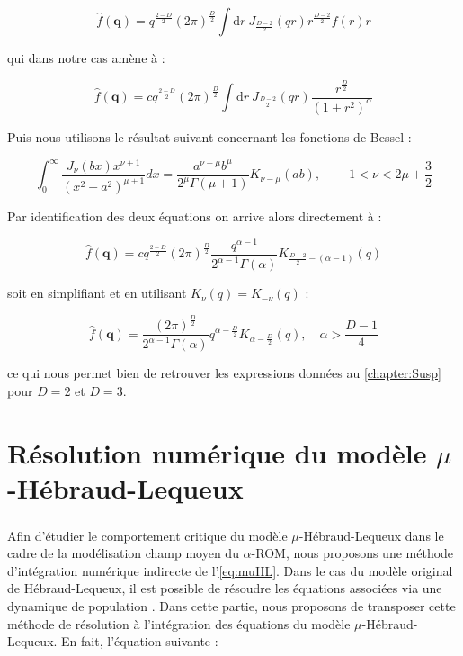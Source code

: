 \begin{equation}
	\hat{f}(\mathbf{q}) = q^{\frac{2-D}{2}}(2\pi)^{\frac{D}{2}}\int\mathrm{d}r~J_{\frac{D-2}{2}}(qr)r^\frac{D-2}{2}f(r)r
\end{equation}

\noindent qui dans notre cas amène à : 

\begin{equation}
	\hat{f}(\mathbf{q}) = c q^{\frac{2-D}{2}}(2\pi)^{\frac{D}{2}}\int\mathrm{d}r~J_{\frac{D-2}{2}}(qr)\frac{r^\frac{D}{2}}{(1+r^2)^\alpha}
\end{equation}

\noindent Puis nous utilisons le résultat suivant concernant les fonctions de Bessel \cite{zwillinger_6_7_2014} :

\begin{equation}
\int_0^{\infty} \frac{J_\nu(b x) x^{\nu+1}}{\left(x^2+a^2\right)^{\mu+1}} d x=\frac{a^{\nu-\mu} b^\mu}{2^\mu \Gamma(\mu+1)} K_{\nu-\mu}(a b), \quad -1 < \nu < 2\mu + \frac{3}{2}
\end{equation}

\noindent Par identification des deux équations on arrive alors directement à :

\begin{equation}
	\hat{f}(\mathbf{q}) = c q^{\frac{2-D}{2}}(2\pi)^{\frac{D}{2}}\frac{q^{\alpha-1}}{2^{\alpha - 1}\Gamma(\alpha)}K_{\frac{D-2}{2}-(\alpha-1)}(q)
\end{equation}

\noindent soit en simplifiant et en utilisant $K_\nu (q) = K_{-\nu}(q)$ :

\begin{equation}
	\hat{f}(\mathbf{q}) = \frac{(2\pi)^{\frac{D}{2}}}{2^{\alpha-1}\Gamma(\alpha)}q^{\alpha-\frac{D}{2}}K_{\alpha-\frac{D}{2}}(q), \quad \alpha > \frac{D-1}{4}
\end{equation}

\noindent ce qui nous permet bien de retrouver les expressions données au \autoref{chapter:Susp} pour $D=2$ et $D=3$.

\section{Résolution numérique du modèle $\mu$-Hébraud-Lequeux}

\label{sec:ResolNumMuHL}

\subparagraph{}Afin d'étudier le comportement critique du modèle $\mu$-Hébraud-Lequeux dans le cadre de la modélisation champ moyen du $\alpha$-ROM, nous proposons une méthode d'intégration numérique indirecte de l'\autoref{eq:muHL}. Dans le cas du modèle original de Hébraud-Lequeux, il est possible de résoudre les équations associées via une dynamique de population \cite{bouchaud_spontaneous_2016}. Dans cette partie, nous proposons de transposer cette méthode de résolution à l'intégration des équations du modèle $\mu$-Hébraud-Lequeux. En fait, l'équation suivante : 

